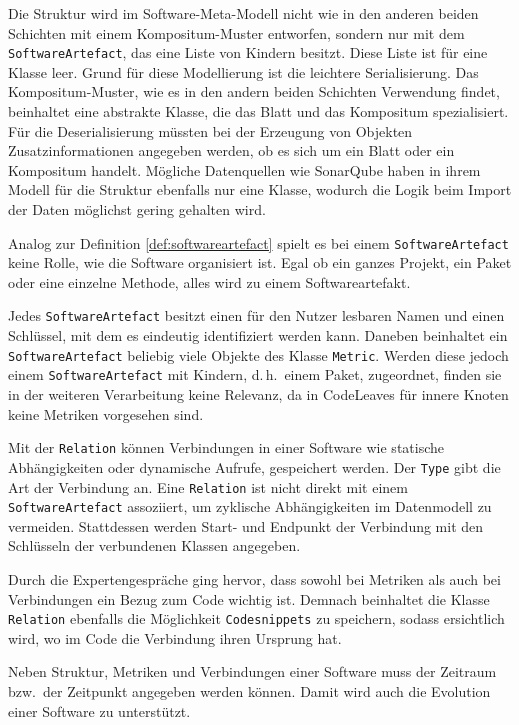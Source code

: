 Die Struktur wird im Software-Meta-Modell nicht wie in den anderen beiden Schichten mit einem Kompositum-Muster entworfen, sondern nur mit dem \texttt{SoftwareArtefact}, das eine Liste von Kindern besitzt. Diese Liste ist für eine Klasse leer. Grund für diese Modellierung ist die leichtere Serialisierung. Das Kompositum-Muster, wie es in den andern beiden Schichten Verwendung findet, beinhaltet eine abstrakte Klasse, die das Blatt und das Kompositum spezialisiert. Für die Deserialisierung müssten bei der Erzeugung von Objekten Zusatzinformationen angegeben werden, ob es sich um ein Blatt oder ein Kompositum handelt. Mögliche Datenquellen wie SonarQube haben in ihrem Modell für die Struktur ebenfalls nur eine Klasse, wodurch die Logik %
beim Import der Daten möglichst gering gehalten wird.

Analog zur Definition \ref{def:softwareartefact} spielt es bei einem \texttt{SoftwareArtefact} keine Rolle, wie die Software organisiert ist. Egal ob ein ganzes Projekt, ein Paket oder eine einzelne Methode, alles wird zu einem Softwareartefakt.

Jedes \texttt{SoftwareArtefact} besitzt einen für den Nutzer lesbaren Namen und einen Schlüssel, mit dem es eindeutig identifiziert werden kann. Daneben beinhaltet ein \texttt{SoftwareArtefact} beliebig viele Objekte des Klasse \texttt{Metric}. Werden diese jedoch einem \texttt{SoftwareArtefact} mit Kindern, d.\,h.\ einem Paket, zugeordnet, finden sie in der weiteren Verarbeitung keine Relevanz, da in CodeLeaves für innere Knoten keine Metriken vorgesehen sind.

Mit der \texttt{Relation} können Verbindungen in einer Software wie statische Abhängigkeiten oder dynamische Aufrufe, gespeichert werden. Der \texttt{Type} gibt die Art der Verbindung an. Eine \texttt{Relation} ist nicht direkt mit einem \texttt{SoftwareArtefact} assoziiert, um zyklische Abhängigkeiten im Datenmodell zu vermeiden. Stattdessen werden Start- und Endpunkt der Verbindung mit den Schlüsseln der verbundenen Klassen angegeben.

Durch die Expertengespräche ging hervor, dass sowohl bei Metriken als auch bei Verbindungen ein Bezug zum Code wichtig ist. Demnach beinhaltet die Klasse \texttt{Relation} ebenfalls die Möglichkeit \texttt{Codesnippets} zu speichern, sodass ersichtlich wird, wo im Code die Verbindung ihren Ursprung hat.

Neben Struktur, Metriken und Verbindungen einer Software muss der Zeitraum bzw.\ der Zeitpunkt angegeben werden können. Damit wird auch die Evolution einer Software zu unterstützt.

